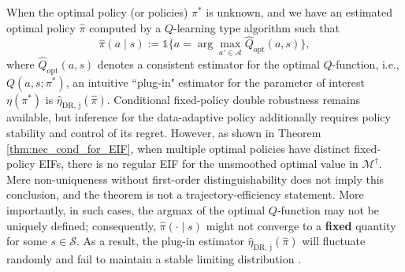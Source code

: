 \documentclass[12pt]{article}
\newtheorem{proposition}[theorem]{Proposition}
\theoremstyle{remark}\newtheorem{remark}[theorem]{Remark}\theoremstyle{plain}
\newcommand{\E}{\mathrm{E}}
\newcommand{\EIF}{S^{\text{eff, nonpar}}}
\begin{document}
When the optimal policy (or policies) $\pi^*$ is unknown, 
and we have an estimated optimal policy 
$\widehat{\pi}$ computed by
a $Q$-learning type algorithm such that 
\[
    \widehat{\pi}(a \mid s) := \mathds{1} \Big\{ a = \arg \max_{a' \in \mathcal{A}} \widehat{Q}_{\text{opt}} (a, s ) \Big\},
\]
where $\widehat{Q}_{\text{opt}} (a, s ) $ denotes a consistent estimator for the optimal $Q$-function, i.e., $Q(a, s; \pi^* )$,
an intuitive ``plug-in" estimator for the parameter of interest $\eta(\pi^*)$ is $\widehat{\eta}_{\text{DR, j}}(\widehat{\pi})$.  Conditional fixed-policy double robustness remains available, but inference for the data-adaptive policy additionally requires policy stability and control of its regret.
However, as shown in Theorem \ref{thm:nec_cond_for_EIF}, when multiple
optimal policies have distinct fixed-policy EIFs, there is no regular
EIF for the unsmoothed optimal value in
$\mathcal M^\dagger$.  Mere non-uniqueness without first-order
distinguishability does not imply this conclusion, and the theorem is
not a trajectory-efficiency statement.
More importantly, in such cases, the argmax of the optimal $Q$-function may not be uniquely defined; consequently, $\widehat{\pi}(\cdot \mid s)$ might not converge to a \textbf{fixed} quantity for some $s \in \mathcal{S}$. As a result, the plug-in estimator $\widehat{\eta}_{\text{DR, j}}(\widehat{\pi})$ will fluctuate randomly and fail to maintain a stable limiting distribution \citep{shi2022statistical}.
\end{document}
